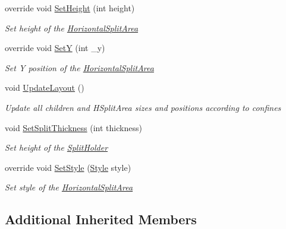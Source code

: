 \begin{DoxyCompactItemize}
override void \mbox{\hyperlink{class_space_v_i_l_1_1_horizontal_split_area_ab018f220de9d5f76f52d3068925d1bdf}{Set\+Height}} (int height)
\begin{DoxyCompactList}\small\item\em Set height of the \mbox{\hyperlink{class_space_v_i_l_1_1_horizontal_split_area}{Horizontal\+Split\+Area}} \end{DoxyCompactList}\item 
override void \mbox{\hyperlink{class_space_v_i_l_1_1_horizontal_split_area_a49f19dd9999b4ab40def3b69b2682973}{SetY}} (int \+\_\+y)
\begin{DoxyCompactList}\small\item\em Set Y position of the \mbox{\hyperlink{class_space_v_i_l_1_1_horizontal_split_area}{Horizontal\+Split\+Area}} \end{DoxyCompactList}\item 
void \mbox{\hyperlink{class_space_v_i_l_1_1_horizontal_split_area_a17787a6998374e9fea24a7a7a466be42}{Update\+Layout}} ()
\begin{DoxyCompactList}\small\item\em Update all children and H\+Split\+Area sizes and positions according to confines \end{DoxyCompactList}\item 
void \mbox{\hyperlink{class_space_v_i_l_1_1_horizontal_split_area_a3e8b87474ea53742d5a84513f8867d4d}{Set\+Split\+Thickness}} (int thickness)
\begin{DoxyCompactList}\small\item\em Set height of the \mbox{\hyperlink{class_space_v_i_l_1_1_split_holder}{Split\+Holder}} \end{DoxyCompactList}\item 
override void \mbox{\hyperlink{class_space_v_i_l_1_1_horizontal_split_area_a6731dd096f00f78595ea45d8993bc636}{Set\+Style}} (\mbox{\hyperlink{class_space_v_i_l_1_1_decorations_1_1_style}{Style}} style)
\begin{DoxyCompactList}\small\item\em Set style of the \mbox{\hyperlink{class_space_v_i_l_1_1_horizontal_split_area}{Horizontal\+Split\+Area}} \end{DoxyCompactList}\end{DoxyCompactItemize}
\subsection*{Additional Inherited Members}


